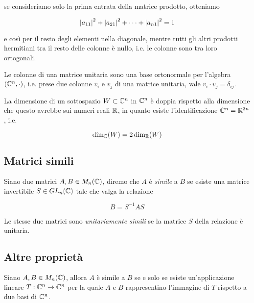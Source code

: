 se consideriamo solo la prima entrata della matrice prodotto, otteniamo

\begin{equation}
	\abs{a_{11}}^{2} + \abs{a_{21}}^{2} + \cdots + \abs{a_{n1}}^{2} = 1
\end{equation}

e così per il resto degli elementi nella diagonale, mentre tutti gli altri prodotti hermitiani tra il resto delle colonne è nullo, i.e. le colonne sono tra loro ortogonali.

\begin{definition}
	Le colonne di una matrice unitaria sono una base ortonormale per l'algebra $ (\mathbb{C}^{n},\cdot) $, i.e. prese due colonne $ v_{i} $ e $ v_{j} $ di una matrice unitaria, vale $ v_{i} \cdot v_{j} = \delta_{ij} $.
\end{definition}


\begin{definition}
	La dimensione di un sottospazio $ W \subset \mathbb{C}^{n} $ in $ \mathbb{C}^{n} $ è doppia rispetto alla dimensione che questo avrebbe sui numeri reali $ \mathbb{R} $, in quanto esiste l'identificazione $ \mathbb{C}^{n} = \mathbb{R}^{2n} $, i.e.

	\begin{equation}
		\dim_{\mathbb{C}}(W) = 2 \dim_{\mathbb{R}}(W)
	\end{equation}
\end{definition}

\subsection{Matrici simili}

Siano due matrici $ A,B \in M_{n}(\mathbb{C}) $, diremo che $ A $ è \textit{simile} a $ B $ se esiste una matrice invertibile $ S \in GL_{n}(\mathbb{C}) $ tale che valga la relazione

\begin{equation}
	B = S^{-1} A S
\end{equation}

Le stesse due matrici sono \textit{unitariamente simili} se la matrice $ S $ della relazione è unitaria.

\subsection{Altre proprietà}

\begin{definition}
	Siano $ A,B \in M_{n}(\mathbb{C}) $, allora $ A $ è simile a $ B $ se e solo se esiste un'applicazione lineare $ T : \mathbb{C}^{n} \to \mathbb{C}^{n} $ per la quale $ A $ e $ B $ rappresentino l'immagine di $ T $ rispetto a due basi di $ \mathbb{C}^{n} $.
\end{definition}

